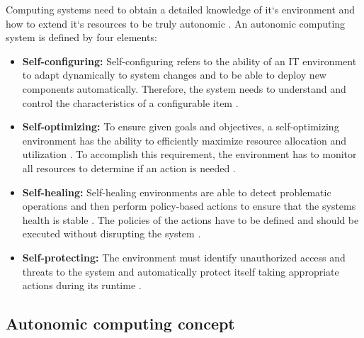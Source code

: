 Computing systems need to obtain a detailed knowledge of it`s environment and how to extend it`s resources to be truly autonomic \cite{Murch2004Autonomic}.
An autonomic computing system is defined by four elements:
\begin{itemize}
\item \textbf{Self-configuring:}
Self-configuring refers to the ability of an IT environment to adapt dynamically to system changes and to be able to deploy new components automatically. Therefore, the system needs to understand and control the characteristics of a configurable item \cite{Murch2004Autonomic, Sinreich2006AnAB}.

\item \textbf{Self-optimizing:}
To ensure given goals and objectives, a self-optimizing environment has the ability to efficiently maximize resource allocation and utilization \cite{Jacob2004AutonomicSolution}. To accomplish this requirement, the environment has to monitor all resources to determine if an action is needed \cite{Murch2004Autonomic}.

\item \textbf{Self-healing:}
Self-healing environments are able to detect problematic operations and then perform policy-based actions to ensure that the systems health is stable \cite{Sinreich2006AnAB, Jacob2004AutonomicSolution}. The policies of the actions have to be defined and should be executed without disrupting the system \cite{Sinreich2006AnAB, Jacob2004AutonomicSolution}.

\item \textbf{Self-protecting:}
The environment must identify unauthorized access and threats to the system and automatically protect itself taking appropriate actions during its runtime \cite{Sinreich2006AnAB, Jacob2004AutonomicSolution}.
\end{itemize}


\subsection{Autonomic computing concept}

